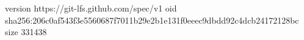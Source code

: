 version https://git-lfs.github.com/spec/v1
oid sha256:206c0af543f3e5560687f7011b29e2b1e131f0eeec9dbdd92c4dcb24172128bc
size 331438
